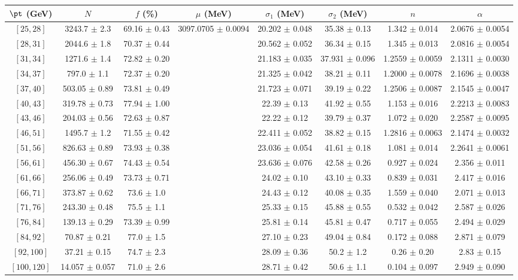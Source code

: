 \begin{tabular}{c||c|c|c|c|c|c|c}
$\pt$ (GeV) & $N$ & $f$ (\%) & $\mu$ (MeV) & $\sigma_1$ (MeV) & $\sigma_2$ (MeV) & $n$ & $\alpha$ \\
\hline
$[25, 28]$ & 3243.7 $\pm$ 2.3 & 69.16 $\pm$ 0.43 & \multirow{17}{*}{3097.0705 $\pm$ 0.0094} & 20.202 $\pm$ 0.048 & 35.38 $\pm$ 0.13 & 1.342 $\pm$ 0.014 & 2.0676 $\pm$ 0.0054\\
$[28, 31]$ & 2044.6 $\pm$ 1.8 & 70.37 $\pm$ 0.44 &  & 20.562 $\pm$ 0.052 & 36.34 $\pm$ 0.15 & 1.345 $\pm$ 0.013 & 2.0816 $\pm$ 0.0054\\
$[31, 34]$ & 1271.6 $\pm$ 1.4 & 72.82 $\pm$ 0.20 &  & 21.183 $\pm$ 0.035 & 37.931 $\pm$ 0.096 & 1.2559 $\pm$ 0.0059 & 2.1311 $\pm$ 0.0030\\
$[34, 37]$ & 797.0 $\pm$ 1.1 & 72.37 $\pm$ 0.20 &  & 21.325 $\pm$ 0.042 & 38.21 $\pm$ 0.11 & 1.2000 $\pm$ 0.0078 & 2.1696 $\pm$ 0.0038\\
$[37, 40]$ & 503.05 $\pm$ 0.89 & 73.81 $\pm$ 0.49 &  & 21.723 $\pm$ 0.071 & 39.19 $\pm$ 0.22 & 1.2506 $\pm$ 0.0087 & 2.1545 $\pm$ 0.0047\\
$[40, 43]$ & 319.78 $\pm$ 0.73 & 77.94 $\pm$ 1.00 &  & 22.39 $\pm$ 0.13 & 41.92 $\pm$ 0.55 & 1.153 $\pm$ 0.016 & 2.2213 $\pm$ 0.0083\\
$[43, 46]$ & 204.03 $\pm$ 0.56 & 72.63 $\pm$ 0.87 &  & 22.22 $\pm$ 0.12 & 39.79 $\pm$ 0.37 & 1.072 $\pm$ 0.020 & 2.2587 $\pm$ 0.0095\\
$[46, 51]$ & 1495.7 $\pm$ 1.2 & 71.55 $\pm$ 0.42 &  & 22.411 $\pm$ 0.052 & 38.82 $\pm$ 0.15 & 1.2816 $\pm$ 0.0063 & 2.1474 $\pm$ 0.0032\\
$[51, 56]$ & 826.63 $\pm$ 0.89 & 73.93 $\pm$ 0.38 &  & 23.036 $\pm$ 0.054 & 41.61 $\pm$ 0.18 & 1.081 $\pm$ 0.014 & 2.2641 $\pm$ 0.0061\\
$[56, 61]$ & 456.30 $\pm$ 0.67 & 74.43 $\pm$ 0.54 &  & 23.636 $\pm$ 0.076 & 42.58 $\pm$ 0.26 & 0.927 $\pm$ 0.024 & 2.356 $\pm$ 0.011\\
$[61, 66]$ & 256.06 $\pm$ 0.49 & 73.73 $\pm$ 0.71 &  & 24.02 $\pm$ 0.10 & 43.10 $\pm$ 0.33 & 0.839 $\pm$ 0.031 & 2.417 $\pm$ 0.016\\
$[66, 71]$ & 373.87 $\pm$ 0.62 & 73.6 $\pm$ 1.0 &  & 24.43 $\pm$ 0.12 & 40.08 $\pm$ 0.35 & 1.559 $\pm$ 0.040 & 2.071 $\pm$ 0.013\\
$[71, 76]$ & 243.30 $\pm$ 0.48 & 75.5 $\pm$ 1.1 &  & 25.33 $\pm$ 0.15 & 45.88 $\pm$ 0.55 & 0.532 $\pm$ 0.042 & 2.587 $\pm$ 0.026\\
$[76, 84]$ & 139.13 $\pm$ 0.29 & 73.39 $\pm$ 0.99 &  & 25.81 $\pm$ 0.14 & 45.81 $\pm$ 0.47 & 0.717 $\pm$ 0.055 & 2.494 $\pm$ 0.029\\
$[84, 92]$ & 70.87 $\pm$ 0.21 & 77.0 $\pm$ 1.5 &  & 27.10 $\pm$ 0.23 & 49.04 $\pm$ 0.84 & 0.172 $\pm$ 0.088 & 2.871 $\pm$ 0.079\\
$[92, 100]$ & 37.21 $\pm$ 0.15 & 74.7 $\pm$ 2.3 &  & 28.09 $\pm$ 0.36 & 50.2 $\pm$ 1.2 & 0.26 $\pm$ 0.20 & 2.83 $\pm$ 0.15\\
$[100, 120]$ & 14.057 $\pm$ 0.057 & 71.0 $\pm$ 2.6 &  & 28.71 $\pm$ 0.42 & 50.6 $\pm$ 1.1 & 0.104 $\pm$ 0.097 & 2.949 $\pm$ 0.090\\
\end{tabular}
